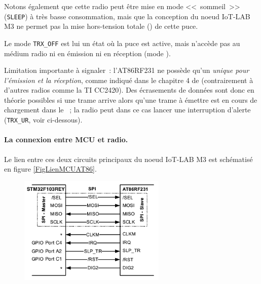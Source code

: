 Notons également que cette radio peut être mise en mode <<~sommeil~>>
(\texttt{SLEEP}) à très basse consommation, mais que la conception du
noeud IoT-LAB M3 ne permet pas la mise hors-tension totale ()
de cette puce.

Le mode \texttt{TRX\_OFF} est lui un état où la puce est active, mais
n'accède pas au médium radio ni en émission ni en réception (mode
).

Limitation importante à signaler~: l'AT86RF231 ne possède qu'un \emph{unique
 pour l'émission et la réception}, comme indiqué dans le
chapitre 4 de \cite{DSAT86RF231} (contrairement à d'autres radios comme la
TI CC2420). Des écrasements de données sont donc en théorie possibles si
une trame arrive alors qu'une trame à émettre est en cours de chargement
dans le ~; la radio peut dans ce cas lancer une
interruption d'alerte (\texttt{TRX\_UR}, voir ci-dessous).

\paragraph{La connexion entre MCU et radio.}

Le lien entre ces deux circuits principaux du noeud IoT-LAB M3 est
schématisé en figure \vref{FigLienMCUAT86}.

\begin{figure}[!hbt]
\centering
\includegraphics[width=7cm]{images/ch6-lien-mcu-at86rf231.png}
\label{FigLienMCUAT86}
\end{figure}

